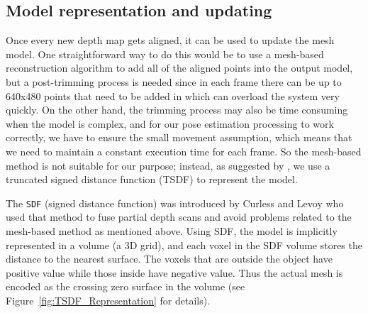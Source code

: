 \documentclass[12pt]{article}
\begin{document}
\subsection{Model representation and updating}

Once every new depth map gets aligned, it can be used to update the mesh model. One straightforward way to do this would be to use a mesh-based reconstruction algorithm to add all of the aligned points into the output model, but a post-trimming process is needed since in each frame there can be up to 640x480 points that need to be added in which can overload the system very quickly. On the other hand, the trimming process may also be time consuming when the model is complex, and for our pose estimation processing to work correctly, we have to ensure the small movement assumption, which means that we need to maintain a constant execution time for each frame. So the mesh-based method is not suitable for our purpose; instead, as suggested by \cite{Newcombe2011}, we use a truncated signed distance function (TSDF) to represent the model. 

The \texttt{SDF} (signed distance function) was introduced by Curless and Levoy \cite{Curless1996} who used that method to fuse partial depth scans and avoid problems related to the mesh-based method as mentioned above. Using SDF, the model is implicitly represented in a volume (a 3D grid), and each voxel in the SDF volume stores the distance to the nearest surface. The voxels that are outside the object have positive value while those inside have negative value. Thus the actual mesh is encoded as the crossing zero surface in the volume (see Figure~\ref{fig:TSDF_Representation} for details). 
\end{document}

